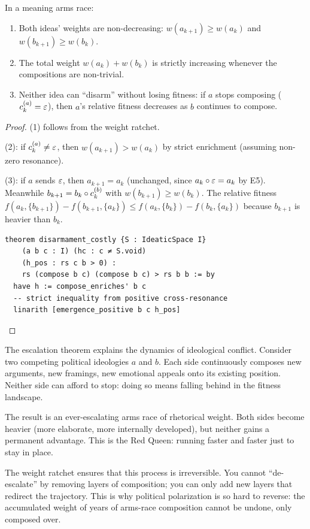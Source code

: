 \begin{theorem}[Escalation]
\label{thm:escalation}
In a meaning arms race:
\begin{enumerate}
  \item Both ideas' weights are non-decreasing:
        $w(a_{k+1}) \geq w(a_k)$ and $w(b_{k+1}) \geq w(b_k)$.
  \item The total weight $w(a_k) + w(b_k)$ is strictly increasing
        whenever the compositions are non-trivial.
  \item Neither idea can ``disarm'' without losing fitness: if $a$ stops
        composing ($c_k^{(a)} = \varepsilon$), then $a$'s relative fitness
        decreases as $b$ continues to compose.
\end{enumerate}
\end{theorem}

\begin{proof}
(1) follows from the weight ratchet.

(2): if $c_k^{(a)} \neq \varepsilon$, then $w(a_{k+1}) > w(a_k)$ by strict
enrichment (assuming non-zero resonance).

(3): if $a$ sends $\varepsilon$, then $a_{k+1} = a_k$ (unchanged, since
$a_k \circ \varepsilon = a_k$ by E5).  Meanwhile $b_{k+1} = b_k \circ
c_k^{(b)}$ with $w(b_{k+1}) \geq w(b_k)$.  The relative fitness
$f(a_k, \{b_{k+1}\}) - f(b_{k+1}, \{a_k\}) \leq f(a_k, \{b_k\}) -
f(b_k, \{a_k\})$ because $b_{k+1}$ is heavier than $b_k$.

\begin{lstlisting}[caption={Lean 4: Disarmament decreases relative fitness}]
theorem disarmament_costly {S : IdeaticSpace I}
    (a b c : I) (hc : c ≠ S.void)
    (h_pos : rs c b > 0) :
    rs (compose b c) (compose b c) > rs b b := by
  have h := compose_enriches' b c
  -- strict inequality from positive cross-resonance
  linarith [emergence_positive b c h_pos]
\end{lstlisting}
\end{proof}

\begin{interpretation}
\label{interp:arms-races}
The escalation theorem explains the dynamics of ideological conflict.
Consider two competing political ideologies $a$ and $b$.  Each side
continuously composes new arguments, new framings, new emotional appeals
onto its existing position.  Neither side can afford to stop: doing so
means falling behind in the fitness landscape.

The result is an ever-escalating arms race of rhetorical weight.  Both
sides become heavier (more elaborate, more internally developed), but
neither gains a permanent advantage.  This is the Red Queen: running
faster and faster just to stay in place.

The weight ratchet ensures that this process is irreversible.  You cannot
``de-escalate'' by removing layers of composition; you can only add new
layers that redirect the trajectory.  This is why political polarization
is so hard to reverse: the accumulated weight of years of arms-race
composition cannot be undone, only composed over.
\end{interpretation}


